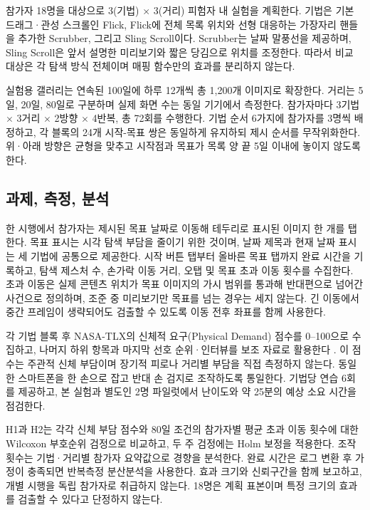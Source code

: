 \documentclass[manuscript,review,nonacm]{acmart}
\begin{document}
참가자 18명을 대상으로 3(기법) $\times$ 3(거리) 피험자 내 실험을 계획한다. 기법은 기본 드래그·관성 스크롤인 Flick, Flick에 전체 목록 위치와 선형 대응하는 가장자리 핸들을 추가한 Scrubber, 그리고 Sling Scroll이다. Scrubber는 날짜 말풍선을 제공하며, Sling Scroll은 앞서 설명한 미리보기와 짧은 당김으로 위치를 조정한다. 따라서 비교 대상은 각 탐색 방식 전체이며 매핑 함수만의 효과를 분리하지 않는다.

실험용 갤러리는 연속된 100일에 하루 12개씩 총 1,200개 이미지로 확장한다. 거리는 5일, 20일, 80일로 구분하며 실제 화면 수는 동일 기기에서 측정한다. 참가자마다 3기법 $\times$ 3거리 $\times$ 2방향 $\times$ 4반복, 총 72회를 수행한다. 기법 순서 6가지에 참가자를 3명씩 배정하고, 각 블록의 24개 시작-목표 쌍은 동일하게 유지하되 제시 순서를 무작위화한다. 위·아래 방향은 균형을 맞추고 시작점과 목표가 목록 양 끝 5일 이내에 놓이지 않도록 한다.

\subsection{과제, 측정, 분석}

한 시행에서 참가자는 제시된 목표 날짜로 이동해 테두리로 표시된 이미지 한 개를 탭한다. 목표 표시는 시각 탐색 부담을 줄이기 위한 것이며, 날짜 제목과 현재 날짜 표시는 세 기법에 공통으로 제공한다. 시작 버튼 탭부터 올바른 목표 탭까지 완료 시간을 기록하고, 탐색 제스처 수, 손가락 이동 거리, 오탭 및 목표 초과 이동 횟수를 수집한다. 초과 이동은 실제 콘텐츠 위치가 목표 이미지의 가시 범위를 통과해 반대편으로 넘어간 사건으로 정의하며, 조준 중 미리보기만 목표를 넘는 경우는 세지 않는다. 긴 이동에서 중간 프레임이 생략되어도 검출할 수 있도록 이동 전후 좌표를 함께 사용한다.

각 기법 블록 후 NASA-TLX의 신체적 요구(Physical Demand) 점수를 0--100으로 수집하고, 나머지 하위 항목과 마지막 선호 순위·인터뷰를 보조 자료로 활용한다 \cite{nasaTlx}. 이 점수는 주관적 신체 부담이며 장기적 피로나 거리별 부담을 직접 측정하지 않는다. 동일한 스마트폰을 한 손으로 잡고 반대 손 검지로 조작하도록 통일한다. 기법당 연습 6회를 제공하고, 본 실험과 별도인 2명 파일럿에서 난이도와 약 25분의 예상 소요 시간을 점검한다.

H1과 H2는 각각 신체 부담 점수와 80일 조건의 참가자별 평균 초과 이동 횟수에 대한 Wilcoxon 부호순위 검정으로 비교하고, 두 주 검정에는 Holm 보정을 적용한다. 조작 횟수는 기법·거리별 참가자 요약값으로 경향을 분석한다. 완료 시간은 로그 변환 후 가정이 충족되면 반복측정 분산분석을 사용한다. 효과 크기와 신뢰구간을 함께 보고하고, 개별 시행을 독립 참가자로 취급하지 않는다. 18명은 계획 표본이며 특정 크기의 효과를 검출할 수 있다고 단정하지 않는다.
\end{document}
